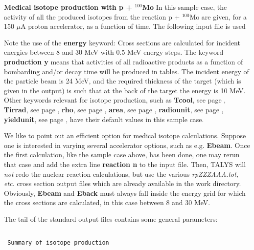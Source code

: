 \begin{samplecase}
{\bf Medical isotope production with p + ${}^{100}$Mo}\newline
In this sample case, the activity of all the produced isotopes from the 
reaction p + ${}^{100}$Mo are given, for a 150 $\mu$A proton accelerator, as a function of time.
The following input file is used


Note the use of the {\bf energy} keyword: Cross sections 
are calculated for incident energies between 8 and 30 MeV with 0.5 MeV 
energy steps. The keyword {\bf production y} means that activities of all 
radioactive products as a function of bombarding and/or decay time will be 
produced in tables. The incident energy of the particle beam is 24 MeV, and
the required thickness of the target (which is given in the output) is such that at the 
back of the target the energy is 10 MeV. Other keywords relevant for isotope 
production, such as 
{\bf Tcool}, see page \pageref{key:Tcool},
{\bf Tirrad}, see page \pageref{key:Tirrad},
{\bf rho}, see page \pageref{key:rho},
{\bf area}, see page \pageref{key:area},
{\bf radiounit}, see page \pageref{key:radiounit},
{\bf yieldunit}, see page \pageref{key:yieldunit},
have their default values in this sample case.

We like to point out an efficient option for medical isotope calculations. 
Suppose one is interested in varying several accelerator options, 
such as e.g. {\bf Ebeam}. Once the first calculation, like the sample case 
above, has been done, one may rerun that case and add the extra line 
{\bf reaction n} to the input file. 
Then, TALYS will {\it not} redo the nuclear reaction calculations, but use the 
various {\it rpZZZAAA.tot, etc.} cross section output files which are already available in the work 
directory. Obviously, {\bf Ebeam} and {\bf Eback} must always fall inside the energy 
grid for which the cross sections are calculated, in this case between 8 and 30 MeV.

The tail of the standard output files contains some general parameters:
{\small \begin{verbatim}

 Summary of isotope production


\end{verbatim}}
\end{samplecase}
